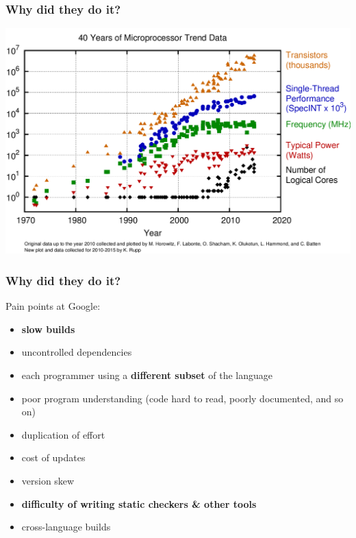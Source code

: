 \documentclass[handout,compress,t,11pt]{beamer}
\begin{document}
\begin{frame}
    \frametitle{Why did they do it?}
    \vspace{0.6\baselineskip}
    \includegraphics[width=\textwidth,height=0.8\textheight]{40-years-processor-trend.png}
\end{frame}

\begin{frame}
    \frametitle{Why did they do it?}
    Pain points at Google:
    \begin{itemize}
    \item {\bf slow builds}
    \vspace{0.2\baselineskip}
    \item uncontrolled dependencies
    \vspace{0.2\baselineskip}
    \item each programmer using a {\bf different subset} of the language
    \vspace{0.2\baselineskip}
    \item poor program understanding (code hard to read, poorly documented, and so on)
    \vspace{0.2\baselineskip}
    \item duplication of effort
    \vspace{0.2\baselineskip}
    \item cost of updates
    \vspace{0.2\baselineskip}
    \item version skew
    \vspace{0.2\baselineskip}
    \item {\bf difficulty of writing static checkers \& other tools}
    \vspace{0.2\baselineskip}
    \item cross-language builds
    \end{itemize}
\end{frame}
\end{document}
